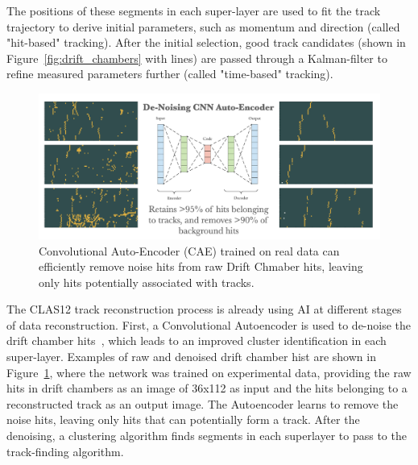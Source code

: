 \documentclass[preprint,12pt]{elsarticle}
\begin{document}
The positions of these segments in each super-layer are used to fit the track trajectory 
to derive initial parameters, such as momentum and direction (called "hit-based" tracking).  After the initial selection, good track candidates 
(shown in Figure~\ref{fig:drift_chambers} with lines) are passed through a Kalman-filter to 
refine measured parameters further (called "time-based" tracking).


\begin{figure}[h!]
\centering
\includegraphics[width=0.85\columnwidth]{images/denoise_autoencoder.png}
\caption{Convolutional Auto-Encoder (CAE) trained on real data can efficiently remove noise hits from raw Drift Chmaber hits, leaving only hits potentially associated with tracks. } 
\label{fig:denoising}
\end{figure}

The CLAS12 track reconstruction process is already using AI at different stages of data reconstruction. First, a Convolutional
Autoencoder is used to de-noise the drift chamber hits~\cite{Thomadakis:2022zcd}, which leads to an improved cluster
identification in each super-layer. Examples of raw and denoised drift chamber hist are shown in Figure~\ref{fig:denoising},
where the network was trained on experimental data, providing the raw hits in drift chambers as an image of 36x112 as input and
the hits belonging to a reconstructed track as an output image. The Autoencoder learns to remove the noise hits, leaving only 
hits that can potentially form a track. After the denoising, a clustering algorithm finds segments in each superlayer to 
pass to the track-finding algorithm.
\end{document}
